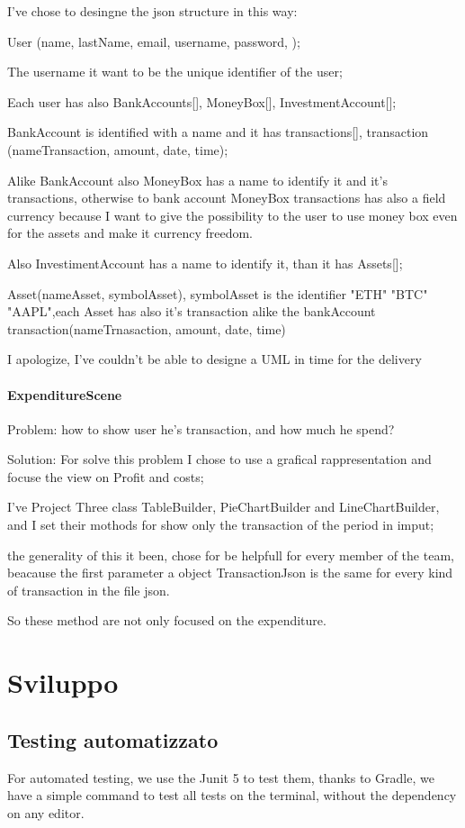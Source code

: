 \documentclass[a4paper,12pt]{report}
\begin{document}
		I've chose to desingne the json structure in this way:
		
		User (name, lastName,  email, username, password, );
		
		The username it want to be the unique identifier of the user;
		
		Each user has also BankAccounts[], MoneyBox[], InvestmentAccount[];
		
		BankAccount is identified with a name and it has transactions[], transaction (nameTransaction, amount, date, time);
		
		Alike BankAccount also MoneyBox has a name to identify it and it's transactions, otherwise to bank account MoneyBox transactions has also a field currency because I want to give the possibility to the user to use money box even for the assets and make it currency freedom.
		
		Also InvestimentAccount has a name to identify it, than it  has Assets[];
		
		Asset(nameAsset, symbolAsset), symbolAsset is the identifier "ETH" "BTC" "AAPL",each Asset has also it's transaction alike the bankAccount transaction(nameTrnasaction, amount, date, time)
		
		I apologize, I've couldn't be able to designe a UML in time for the delivery

	\subsubsection{ExpenditureScene}
	Problem: how to show user he's transaction, and how much he spend?
	
	Solution: For solve this problem I chose to use a grafical rappresentation and focuse the view on Profit and costs;
	
	I've Project Three class TableBuilder, PieChartBuilder and LineChartBuilder, and I set their mothods for show only the transaction of the period in imput;
	
	the generality of this it been, chose for be helpfull for every member of the team, beacause the first parameter a object TransactionJson is the same for every kind of transaction in the file json.
	
	So these method are not only focused on the expenditure.
	
	 

\chapter{Sviluppo}
\section{Testing automatizzato}
For automated testing, we use the Junit 5 to test them, thanks to Gradle, we have a simple command to test all tests on the terminal, without the dependency on any editor. 
\end{document}
